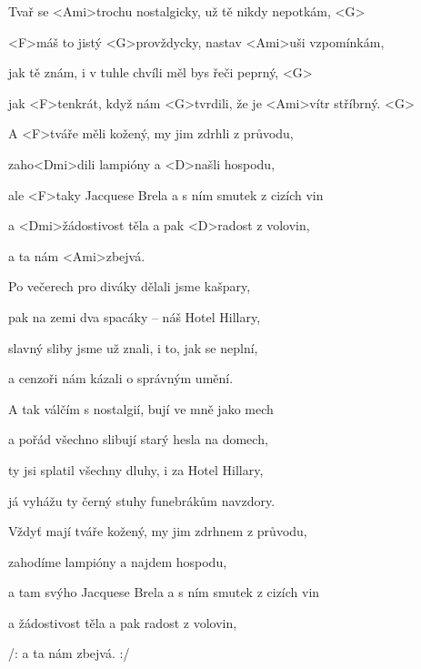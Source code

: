 

\zs
Tvař se <Ami>trochu nostalgicky, už tě nikdy nepotkám, <G>

<F>máš to jistý <G>provždycky, nastav <Ami>uši vzpomínkám,

jak tě znám, i v tuhle chvíli měl bys řeči peprný, <G>

jak <F>tenkrát, když nám <G>tvrdili, že je <Ami>vítr stříbrný. <G>
\ks

\zr
A <F>tváře měli kožený, my jim zdrhli z průvodu,

zaho<Dmi>dili lampióny a <D>našli hospodu,

ale <F>taky Jacquese Brela a s ním smutek z cizích vin

a <Dmi>žádostivost těla a pak <D>radost z volovin,

a ta nám <Ami>zbejvá.
\kr

\zs
Po večerech pro diváky dělali jsme kašpary,

pak na zemi dva spacáky -- náš Hotel Hillary,

slavný sliby jsme už znali, i to, jak se neplní,

a cenzoři nám kázali o správným umění.
\ks

\zr \kr

\zs
A tak válčím s nostalgií, bují ve mně jako mech

a pořád všechno slibují starý hesla na domech,

ty jsi splatil všechny dluhy, i za Hotel Hillary,

já vyhážu ty černý stuhy funebrákům navzdory.
\ks

\zr
Vždyť mají tváře kožený, my jim zdrhnem z průvodu,

zahodíme lampióny a najdem hospodu,

a tam svýho Jacquese Brela a s ním smutek z cizích vin

a žádostivost těla a pak radost z volovin,

/: a ta nám zbejvá. :/
\kr

\kp





